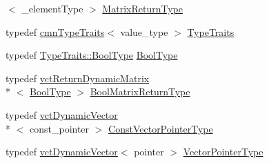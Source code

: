 \begin{DoxyCompactItemize}
$<$ \-\_\-element\-Type $>$ \hyperlink{classvct_dynamic_const_matrix_base_aed2ac5b2cf673fab97a67418f8e69646}{Matrix\-Return\-Type}
\item 
typedef \hyperlink{classcmn_type_traits}{cmn\-Type\-Traits}$<$ value\-\_\-type $>$ \hyperlink{classvct_dynamic_const_matrix_base_a42f1e63cd9923069111d907ec98ac6ee}{Type\-Traits}
\item 
typedef \hyperlink{classcmn_type_traits_aaa41087228a7f165bcd9f4385e644e28}{Type\-Traits\-::\-Bool\-Type} \hyperlink{classvct_dynamic_const_matrix_base_acc160095f46a6928d71f3eb7d33a1b12}{Bool\-Type}
\item 
typedef \hyperlink{classvct_return_dynamic_matrix}{vct\-Return\-Dynamic\-Matrix}\\*
$<$ \hyperlink{classvct_dynamic_const_matrix_base_acc160095f46a6928d71f3eb7d33a1b12}{Bool\-Type} $>$ \hyperlink{classvct_dynamic_const_matrix_base_ac71d88dda7abaaeb2276b83f2e49def7}{Bool\-Matrix\-Return\-Type}
\item 
typedef \hyperlink{classvct_dynamic_vector}{vct\-Dynamic\-Vector}\\*
$<$ const\-\_\-pointer $>$ \hyperlink{classvct_dynamic_const_matrix_base_ae4eb1369d9d05fdf98786c5583834e73}{Const\-Vector\-Pointer\-Type}
\item 
typedef \hyperlink{classvct_dynamic_vector}{vct\-Dynamic\-Vector}$<$ pointer $>$ \hyperlink{classvct_dynamic_const_matrix_base_aa3fdaf7217ea2667db03af719c3371c4}{Vector\-Pointer\-Type}
\end{DoxyCompactItemize}
